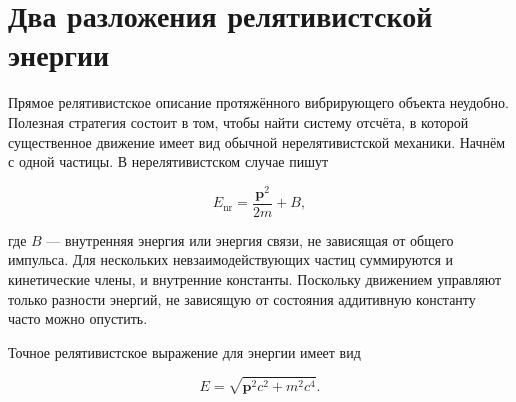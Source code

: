 \begin{classroomqa}
\end{classroomqa}

\begin{classroomqa}
\end{classroomqa}

\section{Два разложения релятивистской энергии}

Прямое релятивистское описание протяжённого вибрирующего объекта неудобно. Полезная стратегия состоит в том, чтобы найти систему отсчёта, в которой существенное движение имеет вид обычной нерелятивистской механики. Начнём с одной частицы. В нерелятивистском случае пишут

\begin{equation}
  E_{\mathrm{nr}}=\frac{\bm p^2}{2m}+B,
  \label{eq:l01-nonrel-energy}
\end{equation}

где \(B\) — внутренняя энергия или энергия связи, не зависящая от общего импульса. Для нескольких невзаимодействующих частиц суммируются и кинетические члены, и внутренние константы. Поскольку движением управляют только разности энергий, не зависящую от состояния аддитивную константу часто можно опустить.

Точное релятивистское выражение для энергии имеет вид

\begin{equation}
  E=\sqrt{\bm p^2c^2+m^2c^4}.
  \label{eq:l01-rel-energy-c}
\end{equation}

